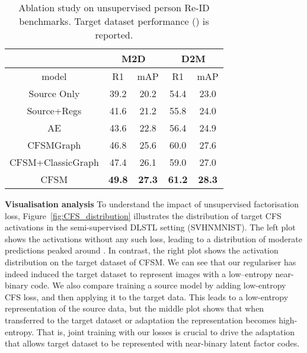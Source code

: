 \documentclass[letterpaper]{article} \usepackage{aaai19}  \usepackage{times}  \usepackage{helvet}  \usepackage{courier}  \usepackage{url}  \usepackage{graphicx}
\newcommand{\keypoint}[1]{\noindent\textbf{#1}\quad}
\begin{document}
\begin{table}[t]
\centering
\small
\begin{tabular}{c|cc|cc}
\hline
\multicolumn{1}{c|}{} & \multicolumn{2}{c|}{M2D} & \multicolumn{2}{c}{D2M} \\ \hline
model                 & R1          & mAP         & R1           & mAP         \\ \hline
Source Only              & 39.2       & 20.2        & 54.4         & 23.0        \\
Source+Regs            & 41.6       & 21.2        & 55.8         & 24.0        \\
AE                     & 43.6       & 22.8        & 56.4         & 24.9        \\ \hline
CFSMGraph            & 46.8        & 25.6        & 60.0         & 27.6        \\ 
CFSM+ClassicGraph              & 47.4        & 26.1        & 59.0         & 27.0        \\ 
CFSM                    & {\bf 49.8}        & {\bf 27.3}        & {\bf 61.2}         & {\bf 28.3}        \\ \hline
\end{tabular}
\caption{Ablation study on unsupervised person Re-ID benchmarks. Target dataset performance () is reported.}
\label{tab:reid_ablation}
\end{table}







\keypoint{Visualisation analysis} To understand the impact of unsupervised factorisation loss, Figure~\ref{fig:CFS_distribution} illustrates the distribution of target CFS activations in the semi-supervised DLSTL setting (SVHNMNIST). The left plot shows the activations without any such loss, leading to a distribution of moderate predictions peaked around . In contrast, the right plot shows the activation distribution on the target dataset of CFSM. We can see that our regulariser has indeed induced the target dataset to represent images with a low--entropy near-binary code. We also compare training a source model by adding low-entropy CFS loss, and then applying it to the target data.
This leads to a low-entropy representation of the source data, but the middle plot shows that when transferred to the target dataset or adaptation the representation becomes high-entropy. That is, joint training with our losses is crucial to drive the adaptation that allows target dataset to be represented with near-binary latent factor codes.
 
\end{document}
